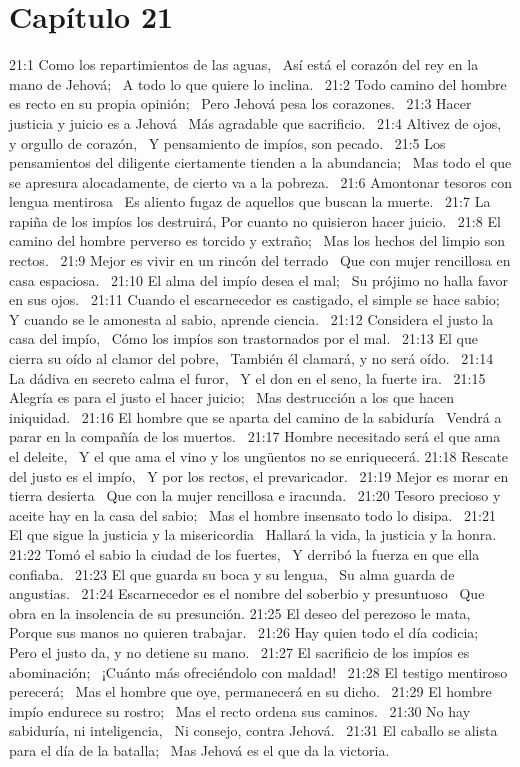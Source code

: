 \section*{Capítulo 21 }

21:1 Como los repartimientos de las aguas,  
Así está el corazón del rey en la mano de Jehová;  
A todo lo que quiere lo inclina.  
21:2 Todo camino del hombre es recto en su propia opinión;  
Pero Jehová pesa los corazones.  
21:3 Hacer justicia y juicio es a Jehová  
Más agradable que sacrificio.  
21:4 Altivez de ojos, y orgullo de corazón,  
Y pensamiento de impíos, son pecado.  
21:5 Los pensamientos del diligente ciertamente tienden a la abundancia;  
Mas todo el que se apresura alocadamente, de cierto va a la pobreza.  
21:6 Amontonar tesoros con lengua mentirosa  
Es aliento fugaz de aquellos que buscan la muerte.  
21:7 La rapiña de los impíos los destruirá, 
Por cuanto no quisieron hacer juicio.  
21:8 El camino del hombre perverso es torcido y extraño;  
Mas los hechos del limpio son rectos.  
21:9 Mejor es vivir en un rincón del terrado  
Que con mujer rencillosa en casa espaciosa.  
21:10 El alma del impío desea el mal;  
Su prójimo no halla favor en sus ojos.  
21:11 Cuando el escarnecedor es castigado, el simple se hace sabio;  
Y cuando se le amonesta al sabio, aprende ciencia.  
21:12 Considera el justo la casa del impío,  
Cómo los impíos son trastornados por el mal.  
21:13 El que cierra su oído al clamor del pobre,  
También él clamará, y no será oído.  
21:14  La dádiva en secreto calma el furor,  
Y el don en el seno, la fuerte ira.  
21:15 Alegría es para el justo el hacer juicio;  
Mas destrucción a los que hacen iniquidad.  
21:16 El hombre que se aparta del camino de la sabiduría  
Vendrá a parar en la compañía de los muertos.  
21:17 Hombre necesitado será el que ama el deleite,  
Y el que ama el vino y los ungüentos no se enriquecerá. 
21:18 Rescate del justo es el impío,  
Y por los rectos, el prevaricador.  
21:19 Mejor es morar en tierra desierta  
Que con la mujer rencillosa e iracunda.  
21:20 Tesoro precioso y aceite hay en la casa del sabio;  
Mas el hombre insensato todo lo disipa.  
21:21 El que sigue la justicia y la misericordia  
Hallará la vida, la justicia y la honra.  
21:22 Tomó el sabio la ciudad de los fuertes,  
Y derribó la fuerza en que ella confiaba.  
21:23 El que guarda su boca y su lengua,  
Su alma guarda de angustias.  
21:24 Escarnecedor es el nombre del soberbio y presuntuoso  
Que obra en la insolencia de su presunción. 
21:25 El deseo del perezoso le mata,  
Porque sus manos no quieren trabajar.  
21:26 Hay quien todo el día codicia;  
Pero el justo da, y no detiene su mano.  
21:27 El sacrificio de los impíos es abominación;  
¡Cuánto más ofreciéndolo con maldad!  
21:28 El testigo mentiroso perecerá;  
Mas el hombre que oye, permanecerá en su dicho.  
21:29 El hombre impío endurece su rostro;  
Mas el recto ordena sus caminos.  
21:30 No hay sabiduría, ni inteligencia,  
Ni consejo, contra Jehová.  
21:31 El caballo se alista para el día de la batalla;  
Mas Jehová es el que da la victoria.  
